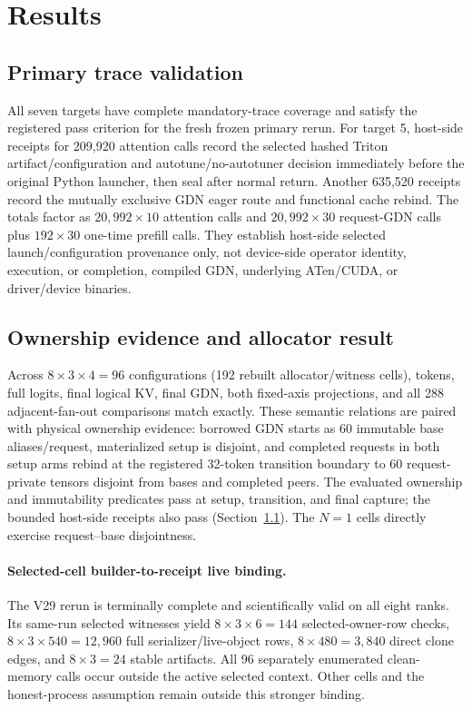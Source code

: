 \documentclass{article}
\begin{document}
\section{Results}
\label{sec:results}

\subsection{Primary trace validation}
\label{sec:target-status}

All seven targets have complete mandatory-trace coverage and satisfy the
registered pass criterion for the fresh frozen primary rerun.  For target 5,
host-side receipts for 209,920 attention calls record the selected hashed
Triton artifact/configuration and autotune/no-autotuner decision immediately
before the original Python launcher, then seal after normal return.  Another
635,520 receipts record the mutually exclusive GDN eager route and functional
cache rebind.  The totals factor as $20{,}992\times10$ attention calls and
$20{,}992\times30$ request-GDN calls plus $192\times30$ one-time prefill calls.
They establish host-side selected launch/configuration provenance only, not
device-side operator identity, execution, or completion, compiled GDN,
underlying ATen/CUDA, or driver/device binaries.

\subsection{Ownership evidence and allocator result}

Across $8\times3\times4=96$ configurations (192 rebuilt allocator/witness
cells), tokens, full logits, final logical KV, final GDN, both fixed-axis
projections, and all 288 adjacent-fan-out comparisons match exactly.  These
semantic relations are paired with physical ownership evidence: borrowed GDN
starts as 60 immutable base aliases/request, materialized setup is disjoint,
and completed requests in both setup arms rebind at the registered 32-token
transition boundary to 60 request-private tensors disjoint from bases and
completed peers.  The evaluated
ownership and immutability predicates pass at setup, transition, and final
capture; the bounded host-side receipts also pass
(Section~\ref{sec:target-status}).  The $N=1$
cells directly exercise request--base disjointness.

\paragraph{Selected-cell builder-to-receipt live binding.}
The V29 rerun is terminally complete and scientifically valid on all eight
ranks.  Its same-run selected witnesses yield
$8\times3\times6=144$ selected-owner-row checks,
$8\times3\times540=12{,}960$ full serializer/live-object rows,
$8\times480=3{,}840$ direct clone edges, and $8\times3=24$ stable artifacts.
All 96 separately enumerated clean-memory calls occur outside the active
selected context.  Other cells and the honest-process assumption remain
outside this stronger binding.
\end{document}
